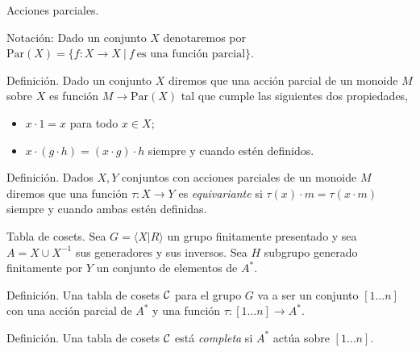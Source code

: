 \documentclass[aspectratio=169, 9pt]{beamer}
\newcommand{\fp}{finitamente presentado }
\newcommand{\In}{[1 \dots n]}
\newcommand{\Co}{{\cal{C}}}
\newcommand{\Par}{\text{Par}(X)}
\begin{document}

\begin{frame}[fragile]{Acciones parciales.}
	
	
	\bigskip
	
	Notación: Dado un conjunto $X$ denotaremos por $\Par = \{ f: X \to X \ | \  f \ \text{es una función parcial} \}$.
	
	\begin{alertblock}{Definición.}
		Dado un conjunto $X$ diremos que una acción parcial de un monoide $M$ sobre $X$ es función $M \to \Par$ tal que cumple las siguientes dos propiedades,
		\begin{itemize}
			\item $x \cdot 1 = x$ para todo $x \in X$;
			\item $x \cdot (g \cdot h) = (x \cdot g) \cdot h$ siempre y cuando estén definidos.
		\end{itemize} 
	\end{alertblock}
	\begin{alertblock}{Definición.}
		Dados $X, Y$ conjuntos con acciones parciales de un monoide $M$ diremos que una función $\tau: X \to Y$ es \emph{equivariante} si $\tau (x) \cdot m = \tau (x \cdot m)$ siempre y cuando ambas estén definidas.
	\end{alertblock}
\end{frame}




\begin{frame}[fragile]{Tabla de cosets.}
Sea $G = \langle X | R \rangle$ un grupo \fp y sea $A = X \cup X^{-1}$ sus generadores y sus inversos.
Sea $H$ subgrupo generado finitamente por $Y$ un conjunto de elementos de $A^*$.

\begin{alertblock}{Definición.}
	Una tabla de cosets $\Co $ para el grupo $G$ va a ser un conjunto $\In$ con una acción parcial de $A^{*}$ y una función $\tau: \In \to A^*$.		
\end{alertblock}

%	


\begin{alertblock}{Definición.}
	Una tabla de cosets $\Co$ está \emph{completa} si $A^*$ actúa sobre $\In$.
\end{alertblock}

\end{frame}
\end{document}
